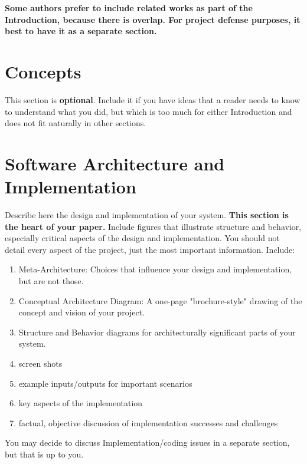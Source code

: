 \documentclass[acmlarge,screen]{acmart}
\begin{document}
\textbf{Some authors prefer to include related works as part of the Introduction, because there
is overlap. For project defense purposes, it best to have it as a separate section.}

\section{Concepts}
This section is \textbf{optional}. Include it if you have ideas that a reader needs to know to
understand what you did, but which is too much for either Introduction and does not
fit naturally in other sections.

\section{Software Architecture and Implementation}
Describe here the design and implementation of your system. \textbf{This section is the heart of your paper.} Include figures that illustrate structure and behavior, especially critical aspects of the design and implementation. You should not detail every aspect of the project, just the most important information. Include:
\begin{enumerate}
    \item Meta-Architecture: Choices that influence your design and implementation, but are not those.
    \item Conceptual Architecture Diagram: A one-page "brochure-style" drawing of the concept and vision of your project.
    \item Structure and Behavior diagrams for architecturally significant parts of your system.
    \item screen shots
    \item example inputs/outputs for important scenarios
    \item key aspects of the implementation
    \item factual, objective discussion of implementation successes and challenges
\end{enumerate}
You may decide to discuss Implementation/coding issues in a separate section, but that is up to you.
\end{document}
